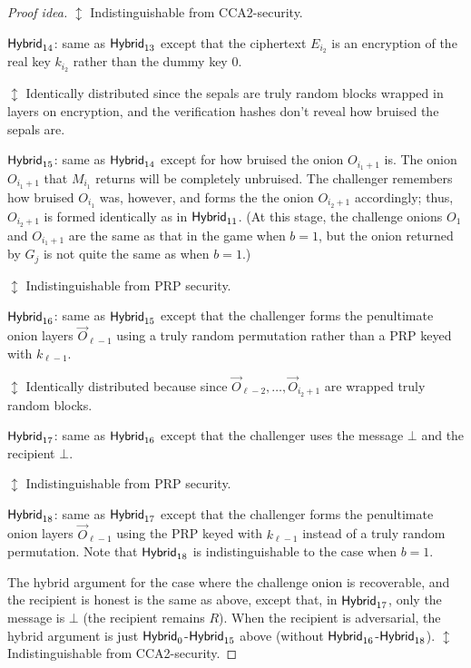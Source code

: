 \documentclass[runningheads,a4paper]{llncs}
\begin{document}
\begin{proof}[Proof idea]
    \textcolor{hybrid}{$\updownarrow$ Indistinguishable from CCA2-security.}

\noindent $\mathsf{Hybrid}_{14}$: same as $\mathsf{Hybrid}_{13}$ except that the ciphertext $E_{i_2}$ is an encryption of the real key $k_{i_2}$ rather than the dummy key $0$. 

    \textcolor{hybrid}{$\updownarrow$ Identically distributed since the sepals are truly random blocks wrapped in layers on encryption, and the verification hashes don't reveal how bruised the sepals are.}

\noindent $\mathsf{Hybrid}_{15}$: same as $\mathsf{Hybrid}_{14}$ except for how bruised the onion $O_{i_1+1}$ is.  The onion $O_{i_1+1}$ that $M_{i_1}$ returns will be completely unbruised.  The challenger remembers how bruised $O_{i_1}$ was, however, and forms the the onion $O_{i_2+1}$ accordingly; thus, $O_{i_2+1}$ is formed identically as in $\mathsf{Hybrid}_{11}$. 
(At this stage, the challenge onions $O_1$ and $O_{i_1+1}$ are the same as that in the game when $b=1$, but the onion returned by $G_j$ is not quite the same as when $b=1$.)


    \textcolor{hybrid}{$\updownarrow$ Indistinguishable from PRP security.}

\noindent $\mathsf{Hybrid}_{16}$: same as $\mathsf{Hybrid}_{15}$ except that the challenger forms the penultimate onion layers $\vec{O}_{\ell-1}$ using a truly random permutation rather than a PRP keyed with $k_{\ell-1}$. 

    \textcolor{hybrid}{$\updownarrow$ Identically distributed because since $\vec{O}_{\ell-2}, \dots, \vec{O}_{i_2+1}$ are wrapped truly random blocks.}

\noindent $\mathsf{Hybrid}_{17}$: same as $\mathsf{Hybrid}_{16}$ except that the challenger uses the message $\bot$ and the recipient $\bot$. 

    \textcolor{hybrid}{$\updownarrow$ Indistinguishable from PRP security.}

\noindent $\mathsf{Hybrid}_{18}$: same as $\mathsf{Hybrid}_{17}$ except that the challenger forms the penultimate onion layers $\vec{O}_{\ell-1}$ using the PRP keyed with $k_{\ell-1}$ instead of a truly random permutation. Note that $\mathsf{Hybrid}_{18}$ is indistinguishable to the case when $b=1$.

The hybrid argument for the case where the challenge onion is recoverable, and the recipient is honest is the same as above, except that, in $\mathsf{Hybrid}_{17}$, only the message is $\bot$ (the recipient remains $R$). 
When the recipient is adversarial, the hybrid argument is just $\mathsf{Hybrid}_{0}$-$\mathsf{Hybrid}_{15}$ above (without $\mathsf{Hybrid}_{16}$-$\mathsf{Hybrid}_{18}$). 
%
\iffalse 
    \textcolor{hybrid}{$\updownarrow$ Indistinguishable from CCA2-security.}


\end{proof}
\end{document}
